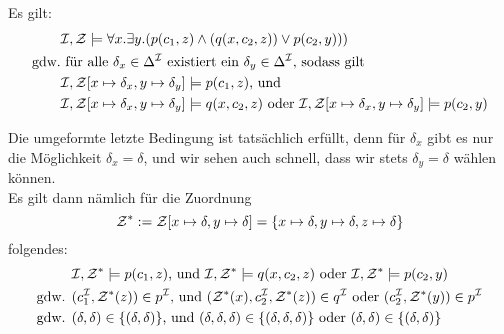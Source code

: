 \begin{enumerate}
Es gilt:
\begin{align*}
&\mathcal{I}, \mathcal{Z} \models \forall x.\exists y.(p(c_1,z) \land (q(x,c_2,z)) \lor p(c_2,y))) \\
\text{gdw.} & \text{ für alle } \delta_x \in \Delta^{\mathcal{I}} \text{ existiert ein } \delta_y \in \Delta^{\mathcal{I}} \text{, sodass gilt} \\
&\mathcal{I},\mathcal{Z} [x \mapsto \delta_x, y \mapsto \delta_y ] \models p(c_1, z) \text{, und} \\
&\mathcal{I},\mathcal{Z} [x \mapsto \delta_x, y \mapsto \delta_y ] \models q(x,c_2,z) \text{ oder } \mathcal{I},\mathcal{Z} [x \mapsto \delta_x, y \mapsto \delta_y ] \models p(c_2,y)
\end{align*}

Die umgeformte letzte Bedingung ist tatsächlich erfüllt, denn für $\delta_x$ gibt es nur die Möglichkeit $\delta_x=\delta$, und wir sehen auch schnell, dass wir stets $\delta_y=\delta$ wählen können. \\
Es gilt dann nämlich für die Zuordnung
\begin{equation*}
\mathcal{Z}^* := \mathcal{Z}[x \mapsto \delta, y \mapsto \delta] = \{x \mapsto \delta, y \mapsto \delta, z \mapsto \delta \}
\end{equation*}
folgendes:
\begin{align*}
& \mathcal{I}, \mathcal{Z}^* \models p(c_1, z) \text{, und } \mathcal{I}, \mathcal{Z}^* \models q(x,c_2,z) \text{ oder } \mathcal{I},\mathcal{Z}^* \models p(c_2,y) \\
\text{gdw. } & (c_1^{\mathcal{I}}, \mathcal{Z}^*(z)) \in p^{\mathcal{I}} \text{, und } (\mathcal{Z}^*(x), c_2^{\mathcal{I}}, \mathcal{Z}^*(z)) \in q^{\mathcal{I}} \text{ oder } (c_2^{\mathcal{I}}, \mathcal{Z}^*(y)) \in p^{\mathcal{I}} \\
\text{gdw. } & (\delta, \delta) \in \{(\delta, \delta)\} \text{, und } (\delta, \delta, \delta) \in \{(\delta, \delta, \delta)\} \text{ oder } (\delta,\delta) \in \{(\delta, \delta) \}
\end{align*}
\end{enumerate}


